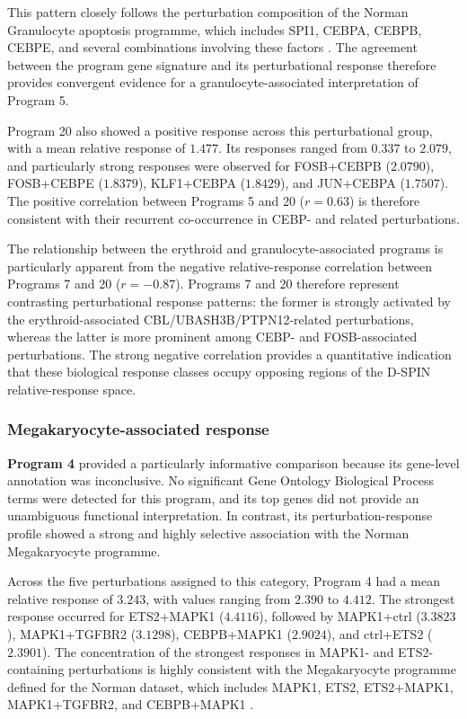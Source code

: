 \documentclass[11pt,a4paper]{article}
\begin{document}
This pattern closely follows the perturbation composition of the Norman Granulocyte apoptosis programme, which includes SPI1, CEBPA, CEBPB, CEBPE, and several combinations involving these factors \citep{Norman2019,Heumos2026}. The agreement between the program gene signature and its perturbational response therefore provides convergent evidence for a granulocyte-associated interpretation of Program 5.

Program 20 also showed a positive response across this perturbational group, with a mean relative response of $1.477$. Its responses ranged from $0.337$ to $2.079$, and particularly strong responses were observed for FOSB+CEBPB ($2.0790$), FOSB+CEBPE ($1.8379$), KLF1+CEBPA ($1.8429$), and JUN+CEBPA ($1.7507$). The positive correlation between Programs 5 and 20 ($r=0.63$) is therefore consistent with their recurrent co-occurrence in CEBP- and related perturbations.

The relationship between the erythroid and granulocyte-associated programs is particularly apparent from the negative relative-response correlation between Programs 7 and 20 ($r=-0.87$). Programs 7 and 20 therefore represent contrasting perturbational response patterns: the former is strongly activated by the erythroid-associated CBL/UBASH3B/PTPN12-related perturbations, whereas the latter is more prominent among CEBP- and FOSB-associated perturbations. The strong negative correlation provides a quantitative indication that these biological response classes occupy opposing regions of the D-SPIN relative-response space.

\subsubsection{Megakaryocyte-associated response}

\textbf{Program 4} provided a particularly informative comparison because its gene-level annotation was inconclusive. No significant Gene Ontology Biological Process terms were detected for this program, and its top genes did not provide an unambiguous functional interpretation. In contrast, its perturbation-response profile showed a strong and highly selective association with the Norman Megakaryocyte programme.

Across the five perturbations assigned to this category, Program 4 had a mean relative response of $3.243$, with values ranging from $2.390$ to $4.412$. The strongest response occurred for ETS2+MAPK1 ($4.4116$), followed by MAPK1+ctrl ($3.3823$), MAPK1+TGFBR2 ($3.1298$), CEBPB+MAPK1 ($2.9024$), and ctrl+ETS2 ($2.3901$). The concentration of the strongest responses in MAPK1- and ETS2-containing perturbations is highly consistent with the Megakaryocyte programme defined for the Norman dataset, which includes MAPK1, ETS2, ETS2+MAPK1, MAPK1+TGFBR2, and CEBPB+MAPK1 \citep{Norman2019,Heumos2026}.
\end{document}
